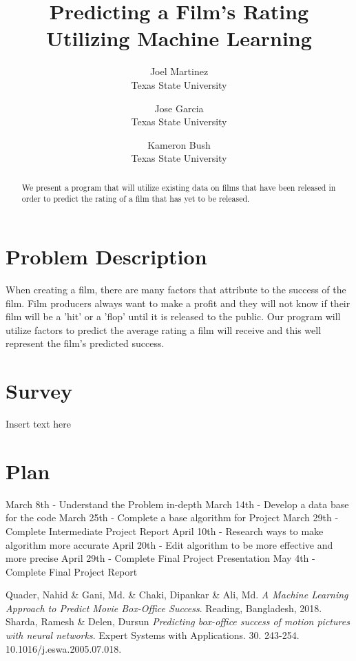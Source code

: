 \documentclass[10pt,twocolumn,letterpaper]{article}
\begin{document}
\title{Predicting a Film's Rating Utilizing Machine Learning}

\author{Joel Martinez\\
Texas State University\\
\and
Jose Garcia\\
Texas State University\\
\and
Kameron Bush\\
Texas State University\\
}
\maketitle

\begin{abstract}
   We present a program that will utilize existing data on films that have been released in order to predict the rating of a film that has yet to be released.
\end{abstract}

\section{Problem Description}
	When creating a film, there are many factors that attribute to the success of the film. Film producers always want to make a profit and they will not know if their film will be a 'hit' or a 'flop' until it is released to the public. Our program will utilize factors to predict the average rating a film will receive and this well represent the film's predicted success.

\section{Survey}
	{Insert text here}

\section{Plan}
	March 8th - Understand the Problem in-depth
	March 14th - Develop a data base for the code
	March 25th - Complete a base algorithm for Project
	March 29th - Complete Intermediate Project Report
	April 10th - Research ways to make algorithm more accurate
	April 20th - Edit algorithm to be more effective and more precise 
	April 29th - Complete Final Project Presentation
	May 4th - Complete Final Project Report


\begin{thebibliography}{9}
	Quader, Nahid \& Gani, Md. \& Chaki, Dipankar \& Ali, Md. 
	\textit{A Machine Learning Approach to Predict Movie Box-Office Success}. 
	Reading, Bangladesh, 2018.
	Sharda, Ramesh \& Delen, Dursun 
	\textit{Predicting box-office success of motion pictures with neural networks}. 
	Expert Systems with Applications. 30. 243-254. 10.1016/j.eswa.2005.07.018.
\end{thebibliography}
\end{document}
